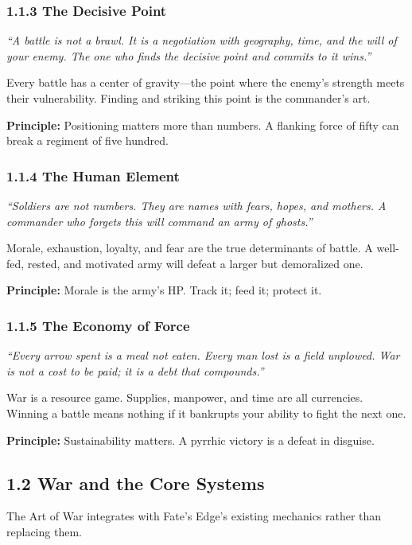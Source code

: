 \documentclass[11pt]{article}
\begin{document}
\subsubsection{1.1.3 The Decisive Point}

\textit{``A battle is not a brawl. It is a negotiation with geography, time, and the will of your enemy. The one who finds the decisive point and commits to it wins.''}

Every battle has a center of gravity—the point where the enemy's strength meets their vulnerability. Finding and striking this point is the commander's art.

\textbf{Principle:} Positioning matters more than numbers. A flanking force of fifty can break a regiment of five hundred.

\subsubsection{1.1.4 The Human Element}

\textit{``Soldiers are not numbers. They are names with fears, hopes, and mothers. A commander who forgets this will command an army of ghosts.''}

Morale, exhaustion, loyalty, and fear are the true determinants of battle. A well-fed, rested, and motivated army will defeat a larger but demoralized one.

\textbf{Principle:} Morale is the army's HP. Track it; feed it; protect it.

\subsubsection{1.1.5 The Economy of Force}

\textit{``Every arrow spent is a meal not eaten. Every man lost is a field unplowed. War is not a cost to be paid; it is a debt that compounds.''}

War is a resource game. Supplies, manpower, and time are all currencies. Winning a battle means nothing if it bankrupts your ability to fight the next one.

\textbf{Principle:} Sustainability matters. A pyrrhic victory is a defeat in disguise.

\subsection{1.2 War and the Core Systems}

The Art of War integrates with Fate's Edge's existing mechanics rather than replacing them.
\end{document}
